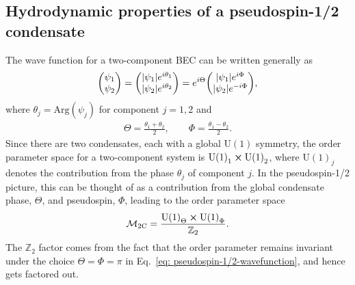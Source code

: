 \subsection{Hydrodynamic properties of a pseudospin-1/2 condensate}
The wave function for a two-component BEC can be written generally as
\begin{align}
    \mqty(\psi_1 \\ \psi_2) =
    \mqty(|\psi_1|e^{i\theta_1} \\ |\psi_2|e^{i\theta_2}) =
    e^{i\Theta}\mqty(|\psi_1|e^{i\Phi} \\ |\psi_2|e^{-i\Phi}),
    \label{eq: pseudospin-1/2-wavefunction}
\end{align}
where \( \theta_j=\mathrm{Arg}(\psi_j) \) for component \( j=1,2 \) and
\begin{align}\label{eq: Theta-Phi}
    \Theta = \frac{\theta_1 + \theta_2}{2}, \qquad
    \Phi = \frac{\theta_1 - \theta_2}{2}.
\end{align}
Since there are two condensates, each with a global \(\text{U}(1)\) symmetry,
the order parameter space for a two-component system is \({\text{U}(1)}_1 \cross
{\text{U}(1)}_2\), where \({\text{U}(1)}_j\) denotes the contribution from
the phase \(\theta_j\) of component \(j\).
In the pseudospin-1/2 picture, this can be thought of as a contribution from the
global condensate phase, \(\Theta \), and pseudospin, \(\Phi \), leading to the
order parameter space~\cite{Eto2011}
\begin{align}
    \mathcal{M}_\text{2C} = \frac{{\text{U}(1)}_\Theta \cross
    {\text{U}(1)}_{\Phi}}{\mathbb{Z}_2}.
\end{align}
The \(\mathbb{Z}_2\) factor comes from the fact that the order parameter remains
invariant under the choice \(\Theta=\Phi=\pi \) in
Eq.~\eqref{eq: pseudospin-1/2-wavefunction}, and hence gets factored out.

